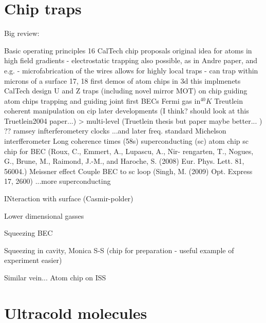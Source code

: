 \section{Chip traps}

Big review: \cite{2011Ac}

Basic operating principles
16 CalTech chip proposals original idea for atoms in high field gradients \cite{PhysRevA.52.4004}
- electrostatic trapping also possible, as in Andre paper, and e.g.  \cite{Bethlem2000}
- microfabrication of the wires allows for highly local traps
- can trap within microns of a surface
17, 18 first demos of atom chips in 3d \cite{PhysRevLett.80.1634} \cite{PhysRevLett.81.5310}
this \cite{Drindic1998} implmenets CalTech design%
U and Z traps \cite{Reichel1999} (including novel mirror MOT)
on chip guiding \cite{PhysRevLett.82.2014}
atom chips trapping and guiding \cite{Folman2000}
joint first BECs \cite{Hansel2001} \cite{Ott2001}
Fermi gas in$^{40}K$ \cite{Aubin2006}
Treutlein coherent manipulation on cip \cite{Treutlein2004}
later developments (I think? should look at this Truetlein2004 paper...)
  > multi-level (Truetlein thesis \cite{Treutlein2008} but paper maybe better... \cite{Boehi2009})
?? ramsey infterferometery
clocks \cite{Knappe2004}
...and later freq. standard \cite{RAMIREZMARTINEZ2011247}
Michelson interfferometer \cite{Wang2005}
Long coherence times (58s) \cite{Deutsch2010}
superconducting (sc) atom chip \cite{Nirrengarten2006}
sc chip for BEC
(Roux, C., Emmert, A., Lupascu, A., Nir- rengarten, T., Nogues, G., Brune, M.,
Raimond, J.-M., and Haroche, S. (2008) Eur. Phys. Lett. 81, 56004.)
Meissner effect \cite{Cano2008}
Couple BEC to sc loop (Singh, M. (2009) Opt. Express 17, 2600)
...more superconducting \cite{Bernon2013}

INteraction with surface (Casmir-polder)
\cite{PhysRevA.72.033610}
\cite{PhysRevLett.98.063201}


Lower dimensional gasses
\cite{PhysRevLett.116.030402}
\cite{Hofferberth2007}
\cite{Yuen2015}

Squeezing BEC
\cite{PhysRevLett.105.080403}

Squeezing in cavity, Monica S-S (chip for preparation - useful example of experiment
easier) \cite{PhysRevLett.104.073604}

Similar vein...  Atom chip on ISS \cite{Frye2021}

\section{Ultracold molecules}

